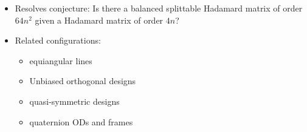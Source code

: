 \documentclass{beamer}
\begin{document}

  


\begin{frame}

  \begin{itemize}
  \item Resolves conjecture: Is there a balanced splittable Hadamard matrix of
    order $64n^2$ given a Hadamard matrix of order $4n$?
  \item Related configurations:
    \begin{itemize}
    \item equiangular lines
    \item Unbiased orthogonal designs
    \item quasi-symmetric designs
    \item quaternion ODs and frames
    \end{itemize}
  \end{itemize}
  
\end{frame}
\end{document}
